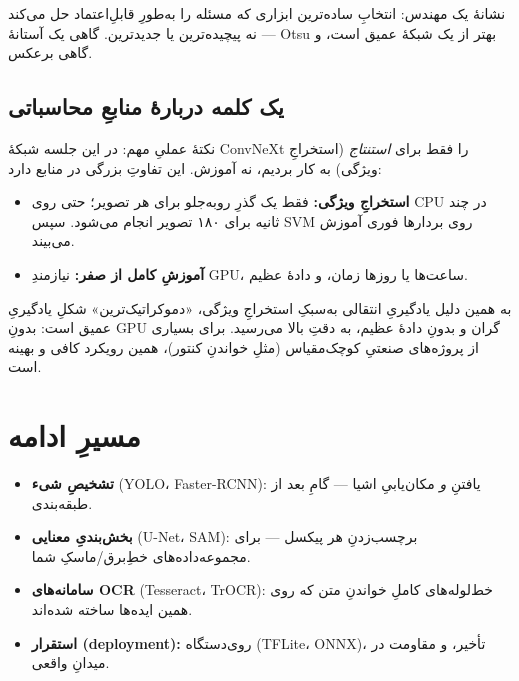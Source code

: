 \documentclass[12pt,a4paper]{article}
\begin{document}
\begin{yaddasht}
نشانهٔ یک مهندس: انتخابِ ساده‌ترین ابزاری که مسئله را به‌طورِ قابلِ‌اعتماد حل می‌کند — نه پیچیده‌ترین یا جدیدترین. گاهی یک آستانهٔ Otsu بهتر از یک شبکهٔ عمیق است، و گاهی برعکس.
\end{yaddasht}

\subsection{یک کلمه دربارهٔ منابعِ محاسباتی}

نکتهٔ عملیِ مهم: در این جلسه شبکهٔ ConvNeXt را فقط برای \emph{استنتاج} (استخراجِ ویژگی) به کار بردیم، نه آموزش. این تفاوتِ بزرگی در منابع دارد:

\begin{itemize}
  \item \textbf{استخراجِ ویژگی:} فقط یک گذرِ رو‌به‌جلو برای هر تصویر؛ حتی روی CPU در چند ثانیه برای ۱۸۰ تصویر انجام می‌شود. سپس SVM روی بردارها فوری آموزش می‌بیند.
  \item \textbf{آموزشِ کامل از صفر:} نیازمندِ GPU، ساعت‌ها یا روزها زمان، و دادهٔ عظیم.
\end{itemize}

\begin{nokte}
به همین دلیل یادگیریِ انتقالی به‌سبکِ استخراجِ ویژگی، «دموکراتیک‌ترین» شکلِ یادگیریِ عمیق است: بدونِ GPUِ گران و بدونِ دادهٔ عظیم، به دقتِ بالا می‌رسید. برای بسیاری از پروژه‌های صنعتیِ کوچک‌مقیاس (مثلِ خواندنِ کنتور)، همین رویکرد کافی و بهینه است.
\end{nokte}

\section{مسیرِ ادامه}

\begin{itemize}
  \item \textbf{تشخیصِ شیء} (YOLO، Faster-RCNN): یافتنِ \emph{و} مکان‌یابیِ اشیا — گامِ بعد از طبقه‌بندی.
  \item \textbf{بخش‌بندیِ معنایی} (U-Net، SAM): برچسب‌زدنِ هر پیکسل — برای مجموعه‌داده‌های خطِ‌برق/ماسکِ شما.
  \item \textbf{سامانه‌های OCR} (Tesseract، TrOCR): خط‌لوله‌های کاملِ خواندنِ متن که روی همین ایده‌ها ساخته شده‌اند.
  \item \textbf{استقرار (deployment):} روی‌دستگاه (TFLite، ONNX)، تأخیر، و مقاومت در میدانِ واقعی.
\end{itemize}
\end{document}
